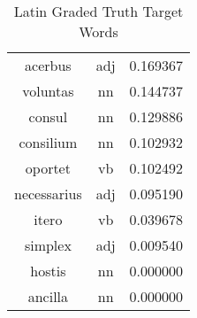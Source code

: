 \begin{table}[h]
\begin{tabular}{ccc}
acerbus     & adj & 0.169367         \\
voluntas    & nn  & 0.144737         \\
consul      & nn  & 0.129886         \\
consilium   & nn  & 0.102932         \\
oportet     & vb  & 0.102492         \\
necessarius & adj & 0.095190         \\
itero       & vb  & 0.039678         \\
simplex     & adj & 0.009540         \\
hostis      & nn  & 0.000000         \\
ancilla     & nn  & 0.000000         \\
\bottomrule
\end{tabular}
\caption{Latin Graded Truth Target Words}
\label{tab:lat-truthtargets}
\end{table}


